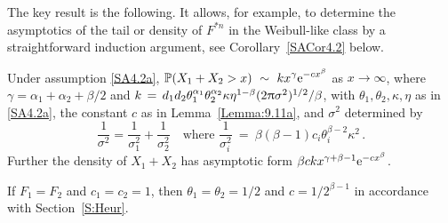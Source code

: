 The key result is the following. It allows, for example,  
to determine the asymptotics of the tail
or density of $F^{*n}$ in the Weibull-like class by a straightforward 
induction argument, see Corollary~\ref{SACor4.2} below.
\begin{theorem}\label{Th:9.11a} Under assumption \eqref{SA4.2a},
$\displaystyle \operatorname{{\mathbb P}}(X_1+X_2>x)\ \sim\ k x^{\gamma}\mathrm{e}^{-cx^\beta}$ as $x\to\infty$, where
$ \gamma=\alpha_1+\alpha_2+\beta/2$ and
$k\,=\, d_1 d_2 \theta_1^{\alpha_1} \theta_2^{\alpha_2} \kappa \eta^{1-\beta} (2\uppi \sigma^2)^{1/2} / \beta$,
with $\theta_1,\theta_2,\kappa,\eta$ as in \eqref{SA4.2a}, the constant $c$ as in Lemma~\ref{Lemma:9.11a}, and $\sigma^2$ determined
by 
\[\frac{1}{\sigma^2}=\frac{1}{\sigma_1^2}+\frac{1}{\sigma_2^2}\quad\text{where }\frac{1}{\sigma_i^2}\ =\ \beta(\beta-1)c_i\theta_i^{\beta-2}\kappa^2 \,. \]
Further the density of $X_1+X_2$ has asymptotic form
$\beta ck x^{\gamma+\beta-1}\mathrm{e}^{-cx^\beta}$.
\end{theorem}
\begin{remark}\label{Rem:9.11a}\rm If $F_1=F_2$ and $c_1=c_2=1$, then $\theta_1=\theta_2=1/2$ and
$c=1/2^{\beta-1}$ in accordance with Section~\ref{S:Heur}.
\halmoss\end{remark}
